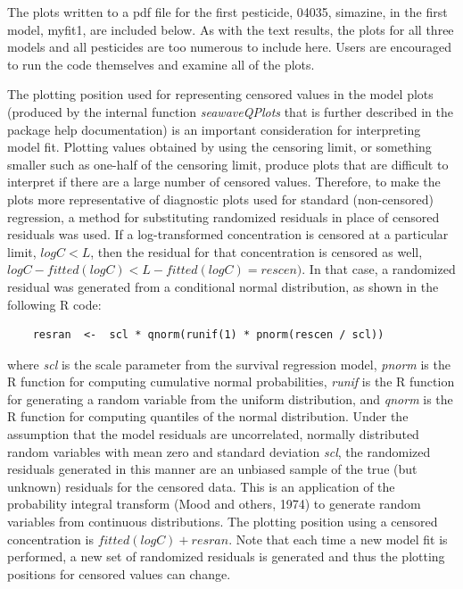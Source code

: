 \documentclass[11pt]{article}
\begin{document}
\vspace{5 mm}

The plots written to a pdf file for the first pesticide, 04035, simazine, in the first model, myfit1, are included below.  As with the text results, the plots for all three models and all pesticides are too numerous to include here.  Users are encouraged to run the code themselves and examine all of the plots.



\vspace{5 mm}

The plotting position used for representing censored values in the model plots (produced by the internal function \textit{seawaveQPlots} that is further described in the package help documentation) is an important consideration for interpreting model fit.  Plotting values obtained by using the censoring limit, or something smaller such as one-half of the censoring limit, produce plots that are difficult to interpret if there are a large number of censored values.  Therefore, to make the plots more representative of diagnostic plots used for standard (non-censored) regression,  a method for substituting randomized residuals in place of censored residuals was used.   If a log-transformed concentration is censored at a particular limit, $logC < L$, then the residual for that concentration is censored as well, $logC - fitted(logC) < L - fitted(logC) = rescen)$.  In that case, a randomized residual was generated from a conditional normal distribution, as shown in the following R code:
\begin{verbatim}
	resran  <-  scl * qnorm(runif(1) * pnorm(rescen / scl))
\end{verbatim}
where \textit{scl} is the scale parameter from the survival regression model, \textit{pnorm} is the R function for computing cumulative normal probabilities, \textit{runif} is the R function for generating a random variable from the uniform distribution, and \textit{qnorm} is the R function for computing quantiles of the normal distribution.  Under the assumption that the model residuals are uncorrelated, normally distributed random variables with mean zero and standard deviation \textit{scl}, the randomized residuals generated in this manner are an unbiased sample of the true (but unknown) residuals for the censored data.  This is an application of the probability integral transform (Mood and others, 1974) to generate random variables from continuous distributions.  The plotting position using a censored concentration is $fitted(logC) + resran$.  Note that each time a new model fit is performed, a new set of randomized residuals is generated and thus the plotting positions for censored values can change.
\end{document}
